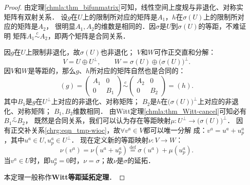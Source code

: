 \begin{proof}
    由定理\ref{chmla:thm_bifunmatrix}可知，线性空间上度规与非退化、对称实矩阵有双射关系．
    设$g$在$U$上的限制所对应的矩阵是$A_1$，$h$在$\sigma(U)$上的限制所对应的矩阵是$A_2$，
    很明显$A_1,A_2$的维数是相同的．因$\sigma$是$U$到$\sigma(U)$的等距，不难证明
    矩阵$A_1\overset{c}{\sim} A_2$，即两个矩阵是合同关系．
    
    因$g$在$U$上限制非退化，故$\sigma(U)$也非退化；
    $V$和$W$可作正交直和分解：
    \begin{equation}\label{chrg:eqn_tmp-wioc}
        V = U \oplus U^\perp, \qquad
        W = \sigma(U) \oplus \bigl(\sigma(U)\bigr)^\perp .
    \end{equation}   
    因$V$和$W$是等距的，那么$g$、$h$所对应的矩阵自然也是合同的：
    \begin{equation}
        (g)=\begin{pmatrix}  A_1 &0 \\ 0 & B_1  \end{pmatrix} \overset{c}{\sim}
        \begin{pmatrix}  A_2 &0 \\ 0 & B_2  \end{pmatrix} =(h) .
    \end{equation}
    其中$B_1$是$g$在$U^\perp$上对应的非退化、对称矩阵；
    $B_2$是$h$在$\bigl(\sigma(U)\bigr)^\perp$上对应的非退化、对称矩阵；
    $B_1,B_2$维数相同．
    由Witt定理\ref{chmla:thm_Witt-cancel}可知必有$B_1 \overset{c}{\sim} B_2$，
    既然是合同关系，我们可以认为存在等距映射$\mu:U^\perp \to \bigl(\sigma(U)\bigr)^\perp$．
    因有正交补关系\eqref{chrg:eqn_tmp-wioc}，故$\forall v^a\in V$都可以唯一分解
    成：$v^a = u^a + u_p^a$，其中$u^a\in U, u_p^a \in U^\perp$．
    现在定义新的等距映射$\nu:V\to W$：
    \begin{equation}
        \nu (v^a)= \nu(u^a + u_p^a) \overset{\mathrm {def}}{=}  \sigma(u^a) + \mu(u_p^a) .
    \end{equation}
    当$v^a\in U$时，即$u_p^a=0$时，$\nu=\sigma$；故$\nu$是$\sigma$的延拓．
    
    本定理一般称作{\bfseries \heiti Witt等距延拓定理}．
\end{proof}

